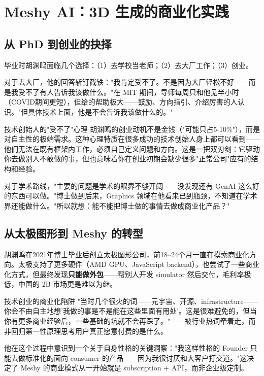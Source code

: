 \section{Meshy AI：3D 生成的商业化实践}

\subsection{从 PhD 到创业的抉择}

毕业时胡渊鸣面临几个选择：（1）去学校当老师；（2）去大厂工作；（3）创业。

对于去大厂，他的回答斩钉截铁："我肯定受不了。不是因为大厂轻松不好——而是我受不了有人告诉我该做什么。"在 MIT 期间，导师每周只和他见半小时（COVID期间更短），但给的帮助极大——鼓励、方向指引、介绍厉害的人认识。"但具体技术上面，他是不会告诉我该做什么的。"

\begin{knowledgebox}{技术创始人的"受不了"心理}
胡渊鸣的创业动机不是金钱（"可能只占5-10\%"），而是对自主性的极端需求。这种心理特质在很多成功的技术创始人身上都可以看到——他们无法在既有框架内工作，必须自己定义问题和方向。这是一把双刃剑：它驱动你去做别人不敢做的事，但也意味着你在创业初期会缺少很多"正常公司"应有的结构和经验。
\end{knowledgebox}

对于学术路线，"主要的问题是学术的眼界不够开阔——没发现还有 GenAI 这么好的东西可以做。"博士做到后来，Graphics 领域在他看来已到瓶颈，不知道在学术界还能做什么。"所以就想：能不能把博士做的事情去做成商业化产品？"

\subsection{从太极图形到 Meshy 的转型}

胡渊鸣在2021年博士毕业后创立太极图形公司，前18--24个月一直在摸索商业化方向。太极支持了更多硬件（AMD GPU、JavaScript backend），也尝试了一些商业化方式，但最终发现\textbf{只能做外包}——帮别人开发 simulator 然后交付，毛利率极低，中国的 2B 市场更是难以为继。

\begin{warningbox}{技术创业的商业化陷阱}
"当时几个很火的词——元宇宙、开源、infrastructure——你会不由自主地想'我做的事是不是能在这些里面有用处'。这是很难避免的，但当你有更多商业经验后，一些基础的坑就不会再踩了。"——被行业热词牵着走，而非回归第一性原理思考用户真正愿意付费的是什么。
\end{warningbox}

他在这个过程中意识到一个关于自身性格的关键洞察："我这样性格的 Founder 只能去做标准化的面向 consumer 的产品——因为我很讨厌和大客户打交道。"这决定了 Meshy 的商业模式从一开始就是 subscription + API，而非企业级定制。


